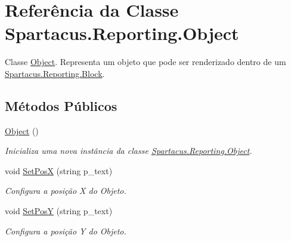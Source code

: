 \hypertarget{classSpartacus_1_1Reporting_1_1Object}{\section{Referência da Classe Spartacus.\+Reporting.\+Object}
\label{classSpartacus_1_1Reporting_1_1Object}
}


Classe \hyperlink{classSpartacus_1_1Reporting_1_1Object}{Object}. Representa um objeto que pode ser renderizado dentro de um \hyperlink{classSpartacus_1_1Reporting_1_1Block}{Spartacus.\+Reporting.\+Block}.  


\subsection*{Métodos Públicos}
\begin{DoxyCompactItemize}
\item 
\hyperlink{classSpartacus_1_1Reporting_1_1Object_ac62f41e07894b3842f8cf79c04217e3f}{Object} ()
\begin{DoxyCompactList}\small\item\em Inicializa uma nova instância da classe \hyperlink{classSpartacus_1_1Reporting_1_1Object}{Spartacus.\+Reporting.\+Object}. \end{DoxyCompactList}\item 
void \hyperlink{classSpartacus_1_1Reporting_1_1Object_abf8e10d826a91cb7ba2b8a00553da573}{Set\+Pos\+X} (string p\+\_\+text)
\begin{DoxyCompactList}\small\item\em Configura a posição X do Objeto. \end{DoxyCompactList}\item 
void \hyperlink{classSpartacus_1_1Reporting_1_1Object_a4b742b79620259b32f847de6f9cd9270}{Set\+Pos\+Y} (string p\+\_\+text)
\begin{DoxyCompactList}\small\item\em Configura a posição Y do Objeto. \end{DoxyCompactList}\end{DoxyCompactItemize}
